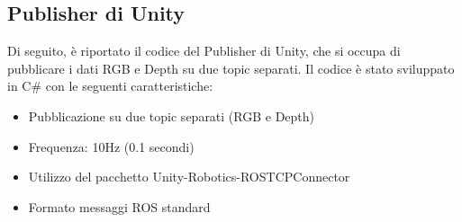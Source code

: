 \documentclass[11pt]{report}
\begin{document}
\subsection{Publisher di Unity}
Di seguito, è riportato il codice del Publisher di Unity, che si occupa di pubblicare i dati RGB e Depth su due topic separati. Il codice è stato sviluppato in C\# con le seguenti caratteristiche:
\begin{itemize}
\item Pubblicazione su due topic separati (RGB e Depth)
\item Frequenza: 10Hz (0.1 secondi)
\item Utilizzo del pacchetto Unity-Robotics-ROSTCPConnector
\item Formato messaggi ROS standard
\end{itemize}
\vspace{-1em} %
\end{document}
